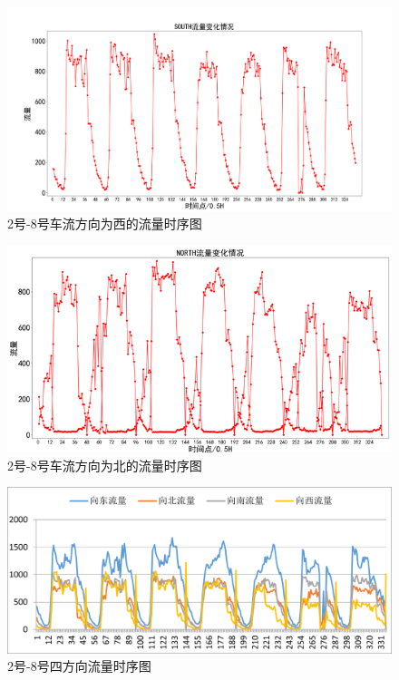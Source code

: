 \documentclass[UTF8]{article}
\begin{document}
        \begin{figure}[H]
            \includegraphics[width=\linewidth]{7.png}
            \caption{2号-8号车流方向为西的流量时序图}
        \end{figure}
        \begin{figure}[H]
            \includegraphics[width=\linewidth]{8.png}
            \caption{2号-8号车流方向为北的流量时序图}
        \end{figure}
        \begin{figure}[H]
            \includegraphics[width=\linewidth]{9.png}
            \caption{2号-8号四方向流量时序图}
        \end{figure}



                
                        



     
            

    


    
\end{document}
